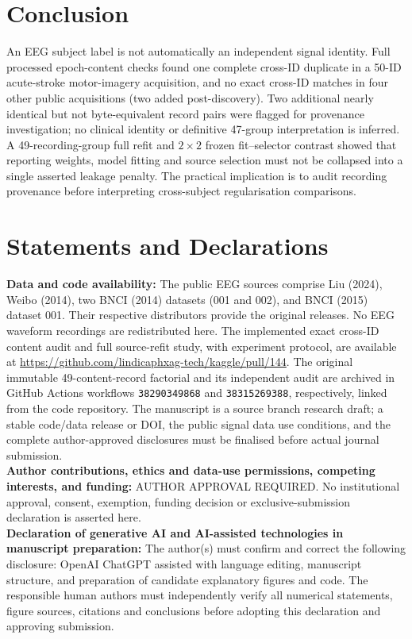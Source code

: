 \documentclass[11pt,a4paper]{article}
\begin{document}
\section{Conclusion}
An EEG subject label is not automatically an independent
signal identity. Full processed epoch-content checks found
one complete cross-ID duplicate in a 50-ID acute-stroke
motor-imagery acquisition, and no exact cross-ID matches
in four other public acquisitions (two added post-discovery).
Two additional nearly identical but not byte-equivalent
record pairs were flagged for provenance investigation;
no clinical identity or definitive 47-group interpretation
is inferred. A 49-recording-group
full refit and $2\times2$ frozen fit--selector contrast
showed that reporting weights, model fitting and source
selection must not be collapsed into a single asserted
leakage penalty. The practical implication is to audit
recording provenance before interpreting cross-subject
regularisation comparisons.

\section*{Statements and Declarations}
\textbf{Data and code availability:}
The public EEG sources comprise Liu (2024),
Weibo (2014), two BNCI (2014) datasets
(001 and 002), and BNCI (2015) dataset 001.
Their respective distributors provide the original releases.
No EEG waveform recordings are redistributed here.
The implemented exact cross-ID content audit and
full source-refit study, with experiment protocol,
are available at
\url{https://github.com/lindicaphxag-tech/kaggle/pull/144}.
The original immutable 49-content-record
factorial and its independent audit are archived
in GitHub Actions workflows
\texttt{38290349868} and \texttt{38315269388},
respectively, linked from the code repository. The manuscript is a source branch
research draft; a stable code/data release or DOI,
the public signal data use conditions, and
the complete author-approved disclosures
must be finalised before actual journal submission.\\
\textbf{Author contributions, ethics and data-use permissions,
competing interests, and funding:} AUTHOR APPROVAL REQUIRED.
No institutional approval, consent, exemption, funding decision or
exclusive-submission declaration is asserted here.\\
\textbf{Declaration of generative AI and AI-assisted technologies
in manuscript preparation:}
The author(s) must confirm and correct the following disclosure:
OpenAI ChatGPT assisted with language editing, manuscript structure,
and preparation of candidate explanatory figures and code.
The responsible human authors must independently verify all
numerical statements, figure sources, citations and conclusions
before adopting this declaration and approving submission.



\end{document}
